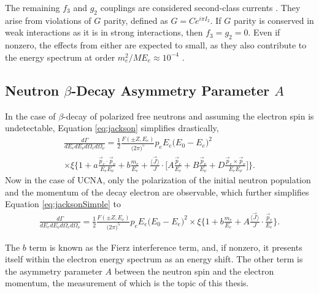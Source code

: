 The remaining $f_3$ and $g_2$ couplings are considered second-class currents \cite{weinberg1958charge}.
They arise from violations of $G$ parity, defined as $G = Ce^{i\pi I_2}$. If $G$ parity is conserved in
weak interactions as it is in strong interactions, then $f_3=g_2=0$. Even if nonzero, the effects
from either are expected to small, as they also contribute to the energy spectrum at order $m_e^2/ME_e \approx 10^{-4}$
\cite{holstein1974recoil,plaster2012}.


\subsection{Neutron $\beta$-Decay Asymmetry Parameter $A$} \label{ssec:neutronAsymmParam}

In the case of $\beta$-decay of polarized free neutrons and assuming the electron spin is undetectable,
Equation \ref{eq:jackson} simplifies drastically,
%
\begin{multline}
  \frac{d\Gamma}{dE_e dE_\nu d\Omega_e d\Omega_\nu} = \frac{1}{2} \frac{F(\pm Z, E_e)}{\big( 2\pi \big)^5}
  p_e E_e \big( E_0 - E_e \big)^2 \\ \times \xi 
  \Bigg\{ 1 + a\frac{\vec{p}_e \cdot \vec{p}_\nu}{E_e E_\nu} + b\frac{m_e}{E_e} 
  + \frac{\langle \vec{J} \rangle}{J} \cdot \Bigg[ A\frac{\vec{p}_e}{E_e}
    + B\frac{\vec{p}_\nu}{E_\nu} + D\frac{\vec{p}_e \times \vec{p}_\nu}{E_e E_\nu}\Bigg]
  \Bigg\}.
  \label{eq:jacksonSimple}
\end{multline}
%
Now in the case of UCNA, only the polarization of the initial neutron population and the momentum
of the decay electron are observable, which further simplifies Equation \ref{eq:jacksonSimple} to
%
\begin{multline}
  \frac{d\Gamma}{dE_e dE_\nu d\Omega_e d\Omega_\nu} = \frac{1}{2} \frac{F(\pm Z, E_e)}{\big( 2\pi \big)^5}
  p_e E_e \big( E_0 - E_e \big)^2 \times \xi 
  \Bigg\{ 1 + b\frac{m_e}{E_e} 
  + A \frac{\langle \vec{J} \rangle}{J} \cdot \frac{\vec{p}_e}{E_e}
  \Bigg\}.
  \label{eq:jacksonSimple2}
\end{multline}
%

The $b$ term is known as the Fierz interference term, and, if nonzero, it presents itself
within the electron energy spectrum as an energy shift. The other term is the asymmetry parameter
$A$ between the neutron spin and the electron momentum, the measurement of which is the topic of
this thesis.

